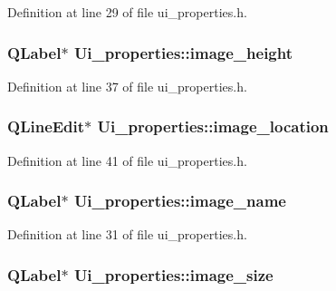 Definition at line 29 of file ui\_\-properties.h.

\hypertarget{classUi__properties_a433aba0e45c4e4f765a24849b9b23811}{
\subsubsection[{image\_\-height}]{\setlength{\rightskip}{0pt plus 5cm}QLabel$\ast$ {\bf Ui\_\-properties::image\_\-height}}}
\label{classUi__properties_a433aba0e45c4e4f765a24849b9b23811}


Definition at line 37 of file ui\_\-properties.h.

\hypertarget{classUi__properties_aecc35167b0fe37745a8d40bcf25c86d8}{
\subsubsection[{image\_\-location}]{\setlength{\rightskip}{0pt plus 5cm}QLineEdit$\ast$ {\bf Ui\_\-properties::image\_\-location}}}
\label{classUi__properties_aecc35167b0fe37745a8d40bcf25c86d8}


Definition at line 41 of file ui\_\-properties.h.

\hypertarget{classUi__properties_ab9a95da6a6b87b6ceeae64de87feb322}{
\subsubsection[{image\_\-name}]{\setlength{\rightskip}{0pt plus 5cm}QLabel$\ast$ {\bf Ui\_\-properties::image\_\-name}}}
\label{classUi__properties_ab9a95da6a6b87b6ceeae64de87feb322}


Definition at line 31 of file ui\_\-properties.h.

\hypertarget{classUi__properties_a16f33c1f91ad25eb781546c86afcf155}{
\subsubsection[{image\_\-size}]{\setlength{\rightskip}{0pt plus 5cm}QLabel$\ast$ {\bf Ui\_\-properties::image\_\-size}}}
\label{classUi__properties_a16f33c1f91ad25eb781546c86afcf155}


